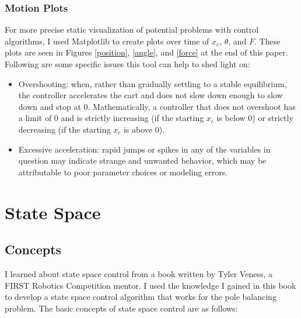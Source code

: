 \documentclass[11pt]{article}
\begin{document}
\subsubsection{Motion Plots}

For more precise static visualization of potential problems with control algorithms, I used Matplotlib \cite{matplotlib} to create plots over time of $x _c$, $\theta$, and $F$. These plots are seen in Figures \ref{position}, \ref{angle}, and \ref{force} at the end of this paper. Following are some specific issues this tool can help to shed light on:

\begin{itemize}
    \item Overshooting: when, rather than gradually settling to a stable equilibrium, the controller accelerates the cart and does not slow down enough to slow down and stop at 0. Mathematically, a controller that does not overshoot has a limit of 0 and is strictly increasing (if the starting $x _c$ is below 0) or strictly decreasing (if the starting $x _c$ is above 0).
    \item Excessive acceleration: rapid jumps or spikes in any of the variables in question may indicate strange and unwanted behavior, which may be attributable to poor parameter choices or modeling errors.
\end{itemize}

\section{State Space}

\subsection{Concepts}

I learned about state space control from a book \cite{veness} written by Tyler Veness, a FIRST Robotics Competition mentor. I used the knowledge I gained in this book to develop a state space control algorithm that works for the pole balancing problem. The basic concepts of state space control are as follows:
\end{document}

